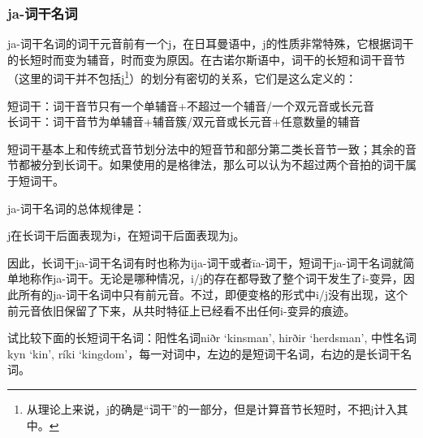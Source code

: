 \subsubsection{ja-词干名词}

ja-词干名词的词干元音前有一个j，在日耳曼语中，j的性质非常特殊，它根据词干的长短时而变为辅音，时而变为原因。在古诺尔斯语中，词干的长短和词干音节（这里的词干并不包括j\footnote{从理论上来说，j的确是``词干''的一部分，但是计算音节长短时，不把j计入其中。}）的划分有密切的关系，它们是这么定义的：

\begin{info}
  短词干：词干音节只有一个单辅音+不超过一个辅音/一个双元音或长元音\\
  长词干：词干音节为单辅音+辅音簇/双元音或长元音+任意数量的辅音
\end{info}

短词干基本上和传统式音节划分法中的短音节和部分第二类长音节一致；其余的音节都被分到长词干。如果使用的是格律法，那么可以认为不超过两个音拍的词干属于短词干。

ja-词干名词的总体规律是：

\begin{info}
  j在长词干后面表现为i，在短词干后面表现为j。
\end{info}

因此，长词干ja-词干名词有时也称为ija-词干或者īa-词干，短词干ja-词干名词就简单地称作ja-词干。无论是哪种情况，i/j的存在都导致了整个词干发生了i-变异，因此所有的ja-词干名词中只有前元音。不过，即便变格的形式中i/j没有出现，这个前元音依旧保留了下来，从共时特征上已经看不出任何i-变异的痕迹。

试比较下面的长短词干名词：阳性名词niðr `kinsman', hirðir `herdsman',
中性名词kyn `kin', ríki
`kingdom'，每一对词中，左边的是短词干名词，右边的是长词干名词。


